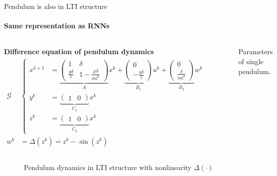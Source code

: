 \documentclass[8pt, t,
aspectratio=169,%
]{beamer}
\begin{document}
\begin{frame}{Pendulum is also in LTI structure}
    \framesubtitle{Same representation as RNNs}
    \vspace{-0.2cm}
    \begin{columns}[T]
        \textbf{Difference equation of pendulum dynamics}
        \begin{align*}
            \mathcal{G} &\left\{ \begin{aligned} 
                x^{k+1} & = 
                \underbrace{\begin{pmatrix}
                    1 & \delta \\
                    \frac{g \delta}{l} & 1 - \frac{\mu \delta}{m l^2}
                \end{pmatrix}}_A
                x^k + 
                \underbrace{\begin{pmatrix}
                    0 \\
                    -\frac{g\delta}{l}
                \end{pmatrix}}_{B_1}
                u^k +
                \underbrace{\begin{pmatrix}
                    0 \\
                    \frac{\delta}{ml^2}
                \end{pmatrix}}_{B_2}
                w^k \\
                y^k & = 
                \underbrace{\begin{pmatrix}
                    1 & 0
                \end{pmatrix}}_{C_1} x^k \\
                z^k & = 
                \underbrace{\begin{pmatrix}
                    1 & 0
                \end{pmatrix}}_{C_2}
                x^k
            \end{aligned} \right.\\
            w^k &  = \Delta(z^k) = z^k - \sin(z^k)
        \end{align*}
        \begin{figure}
            
            \caption{Parameters of single pendulum.}
        \end{figure}
    \end{columns}
    \begin{figure}
        
        \caption{Pendulum dynamics in LTI structure with nonlinearity $\Delta(\cdot)$}
    \end{figure}
    
\end{frame}
\end{document}
